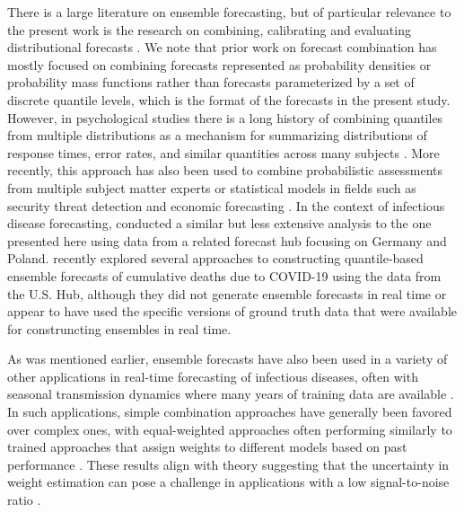 \documentclass[11pt,3p,authoryear]{elsarticle}
\begin{document}
There is a large literature on ensemble forecasting, but of particular relevance to the present work is the research on combining, calibrating and evaluating distributional forecasts \citep{gneiting_strictly_2007,gneiting_probabilistic_2007,ranjan_combining_2010,claeskens_forecast_2016}.
We note that prior work on forecast combination has mostly focused on combining forecasts represented as probability densities or probability mass functions rather than forecasts parameterized by a set of discrete quantile levels, which is the format of the forecasts in the present study.
However, in psychological studies there is a long history of combining quantiles from multiple distributions as a mechanism for summarizing distributions of response times, error rates, and similar quantities across many subjects \citep{vincent1912functionsOfVibrissae, ratcliff1979vincentization}.
More recently, this approach has also been used to combine probabilistic assessments from multiple subject matter experts or statistical models in fields such as security threat detection and economic forecasting \citep{hora2013medianAggregationDistribution, lichtendahl2013betterAveProbQuant, gaba2017combiningIntervalForecasts,
busetti2017quantileAggregationDensityForecasts}.
In the context of infectious disease forecasting, \cite{bracher_preregistered_covid_de_pl_2021} conducted a similar but less extensive analysis to the one presented here using data from a related forecast hub focusing on Germany and Poland. \cite{taylor2021combiningForecastsCOVID} recently explored several approaches to constructing quantile-based ensemble forecasts of cumulative deaths due to COVID-19 using the data from the U.S. Hub, although they did not generate ensemble forecasts in real time or appear to have used the specific versions of ground truth data that were available for construncting ensembles in real time.

As was mentioned earlier, ensemble forecasts have also been used in a variety of other applications in real-time forecasting of infectious diseases, often with seasonal transmission dynamics where many years of training data are available \citep{yamana_superensemble_2016,reich_accuracy_2019,reis_superensemble_2019,colon-gonzalez_probabilistic_2021}.
In such applications, simple combination approaches have generally been favored over complex ones, with equal-weighted approaches often performing similarly to trained approaches that assign weights to different models based on past performance \citep{ray_feature_weighted_ensembles, bracher_preregistered_covid_de_pl_2021}.
These results align with theory suggesting that the uncertainty in weight estimation can pose a challenge in applications with a low signal-to-noise ratio \citep{claeskens_forecast_2016}.
\end{document}
